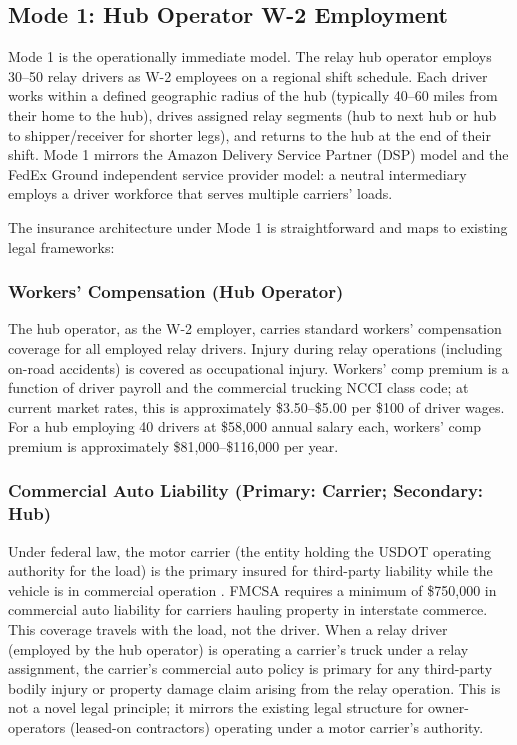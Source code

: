 \subsection{Mode 1: Hub Operator W-2 Employment}

Mode 1 is the operationally immediate model. The relay hub operator employs 30--50 relay drivers as W-2 employees on a regional shift schedule. Each driver works within a defined geographic radius of the hub (typically 40--60 miles from their home to the hub), drives assigned relay segments (hub to next hub or hub to shipper/receiver for shorter legs), and returns to the hub at the end of their shift. Mode 1 mirrors the Amazon Delivery Service Partner (DSP) model and the FedEx Ground independent service provider model: a neutral intermediary employs a driver workforce that serves multiple carriers' loads.

The insurance architecture under Mode 1 is straightforward and maps to existing legal frameworks:

\subsubsection*{Workers' Compensation (Hub Operator)}

The hub operator, as the W-2 employer, carries standard workers' compensation coverage for all employed relay drivers. Injury during relay operations (including on-road accidents) is covered as occupational injury. Workers' comp premium is a function of driver payroll and the commercial trucking NCCI class code; at current market rates, this is approximately \$3.50--\$5.00 per \$100 of driver wages. For a hub employing 40 drivers at \$58,000 annual salary each, workers' comp premium is approximately \$81,000--\$116,000 per year.

\subsubsection*{Commercial Auto Liability (Primary: Carrier; Secondary: Hub)}

Under federal law, the motor carrier (the entity holding the USDOT operating authority for the load) is the primary insured for third-party liability while the vehicle is in commercial operation \citep{FMCSA_HOS2022}. FMCSA requires a minimum of \$750,000 in commercial auto liability for carriers hauling property in interstate commerce. This coverage travels with the load, not the driver. When a relay driver (employed by the hub operator) is operating a carrier's truck under a relay assignment, the carrier's commercial auto policy is primary for any third-party bodily injury or property damage claim arising from the relay operation. This is not a novel legal principle; it mirrors the existing legal structure for owner-operators (leased-on contractors) operating under a motor carrier's authority.

